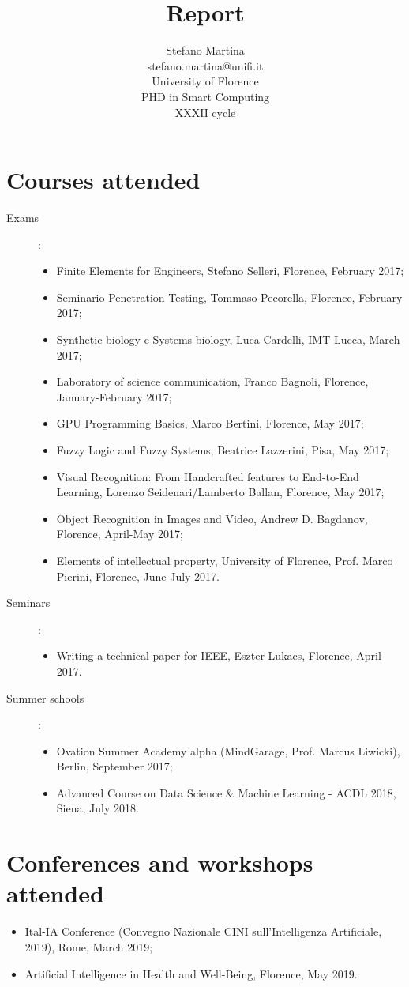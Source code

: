 \documentclass[a4paper,oneside]{article}
\author{
  {\Large Stefano Martina}\\
  {\small stefano.martina@unifi.it}\\
  University of Florence\\
  PHD in Smart Computing\\
  XXXII cycle
}
\title{{\Huge\bfseries Report}}
\begin{document}
\maketitle
\thispagestyle{empty}
\acresetall




\section{Courses attended}

\begin{description}
\item[Exams]:
  \begin{itemize}
    \item Finite Elements for Engineers, Stefano Selleri, Florence, February
    2017;
    \item Seminario Penetration Testing, Tommaso Pecorella, Florence,
      February 2017;
    \item Synthetic biology e Systems biology, Luca Cardelli, IMT
      Lucca, March 2017;
    \item Laboratory of science communication, Franco Bagnoli, Florence,
      January-February 2017;
    \item GPU Programming Basics, Marco Bertini, Florence, May 2017;
    \item Fuzzy Logic and Fuzzy Systems, Beatrice Lazzerini,
      Pisa, May 2017;
    \item Visual Recognition: From Handcrafted features to End-to-End
      Learning, Lorenzo Seidenari/Lamberto Ballan, Florence, May
      2017;
    \item Object Recognition in Images and Video, Andrew D. Bagdanov,
      Florence, April-May 2017;
    \item Elements of intellectual property, University of Florence, Prof. Marco Pierini,
      Florence, June-July 2017.
  \end{itemize}
\item[Seminars]:
  \begin{itemize}
    \item Writing a technical paper for IEEE, Eszter Lukacs,
      Florence, April 2017.
  \end{itemize}
\item[Summer schools]:
  \begin{itemize}
  \item Ovation Summer Academy alpha (MindGarage, Prof. Marcus
    Liwicki), Berlin, September 2017;
  \item Advanced Course on Data Science \& Machine Learning - ACDL
    2018, Siena, July 2018.
  \end{itemize}
\end{description}

\section{Conferences and workshops attended}
\begin{itemize}
\item Ital-IA Conference (Convegno Nazionale CINI sull'Intelligenza
  Artificiale, 2019), Rome, March 2019;
\item Artificial Intelligence in Health and Well-Being, Florence,
  May 2019.
\end{itemize}
\end{document}
